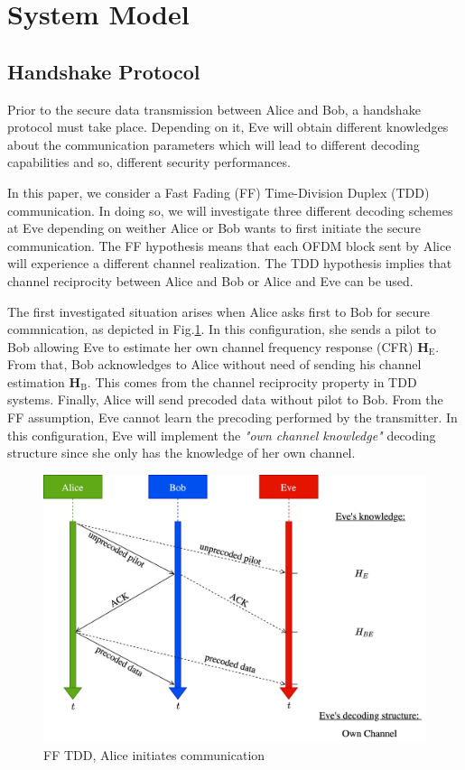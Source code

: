 \documentclass[journal,comsoc]{IEEEtran}
\let\MYoriglatexcaption\caption
\renewcommand{\caption}[2][\relax]{\MYoriglatexcaption[#2]{#2}}
\newcommand{\HE}{\textbf{H}_{\text{E}}}
\newcommand{\HB}{\textbf{H}_{\text{B}}}
\begin{document}
\section{System Model}\label{sec:system-model}

\subsection{Handshake Protocol}
\label{sec:establishment}
Prior to the secure data transmission between Alice and Bob, a handshake protocol must take place. Depending on it, Eve will obtain different knowledges about the communication parameters which will lead to different decoding capabilities and so, different security performances. 

In this paper, we consider a Fast Fading (FF) Time-Division Duplex (TDD) communication. In doing so, we will investigate three different decoding schemes at Eve depending on weither Alice or Bob wants to first initiate the secure communication. The FF hypothesis means that each OFDM block sent by Alice will experience a different channel realization. The TDD hypothesis implies that channel reciprocity between Alice and Bob or Alice and Eve can be used. 

The first investigated situation arises when Alice asks first to Bob for secure commnication, as depicted in Fig.\ref{fig_ff_tdd_a}. In this configuration, she sends a pilot to Bob allowing Eve to estimate her own channel frequency response (CFR) $\HE$. From that, Bob acknowledges to Alice without need of sending his channel estimation $\HB$. This comes from the channel reciprocity property in TDD systems. Finally, Alice will send precoded data without pilot to Bob. From the FF assumption, Eve cannot learn the precoding performed by the transmitter. In this configuration, Eve will implement the \textit{"own channel knowledge"} decoding structure since she only has the knowledge of her own channel. 
\begin{figure}[!ht]
	\centering
	\includegraphics[width=.9\linewidth]{graphs/diagram_sequence-FF_TDD_A.jpg}
	\caption{FF TDD, Alice initiates communication}
	\label{fig_ff_tdd_a}
\end{figure}
\end{document}
